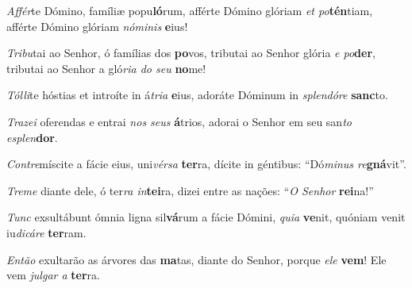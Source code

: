 \begin{greenumerate}
  \switchcolumn*


  \item \textit{Affér}te Dómino, famíliæ popu\textbf{ló}rum, {\GreDagger} afférte Dómino glóriam \textit{et po}\textbf{tén}tiam, {\GreStar} afférte Dómino glóriam \textit{nóminis} \textbf{e}ius! 

  \switchcolumn%

  \item \textit{Tribu}tai ao Senhor, ó famílias dos \textbf{po}vos, {\GreDagger} tributai ao Senhor glória \textit{e po}\textbf{der}, {\GreStar} tributai ao Senhor a gló\textit{ria do seu} \textbf{no}me! 

  \switchcolumn*


  \item \textit{Tólli}te hóstias et introíte in á\textit{tria} \textbf{e}ius, {\GreStar} adoráte Dóminum in \textit{splendóre} \textbf{sanc}to. 

  \switchcolumn%

  \item \textit{Trazei} oferendas e entrai \textit{nos seus} \textbf{á}trios, {\GreStar} adorai o Senhor em seu san\textit{to esplen}\textbf{dor}. 

  \switchcolumn*


  \item \textit{Contre}míscite a fácie eius, uni\textit{vérsa} \textbf{ter}ra, {\GreStar} dícite in géntibus: ``Dó\textit{minus re}\textbf{gná}vit''. 

  \switchcolumn%

  \item \textit{Treme} diante dele, ó ter\textit{ra in}\textbf{tei}ra, {\GreStar} dizei entre as nações: ``\textit{O Senhor} \textbf{rei}na!'' 

  \switchcolumn*


  \item \textit{Tunc} exsultábunt ómnia ligna sil\textbf{vá}rum {\GreDagger} a fácie Dómini, \textit{quia} \textbf{ve}nit, {\GreStar} quóniam venit iu\textit{dicáre} \textbf{ter}ram. 

  \switchcolumn%

  \item \textit{Então} exultarão as árvores das \textbf{ma}tas, {\GreDagger} diante do Senhor, porque \textit{ele} \textbf{vem}! {\GreStar} Ele vem \textit{julgar a} \textbf{ter}ra. 


\end{greenumerate}
